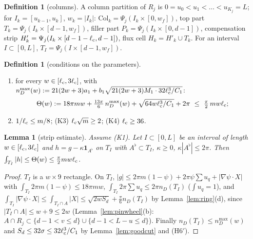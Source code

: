 \documentclass[11pt]{article}
\newtheorem{lemma}[theorem]{Lemma}
\theoremstyle{definition}
\newtheorem{definition}[theorem]{Definition}
\theoremstyle{remark}
\newcommand{\lc}{\ell_{\rm c}}
\begin{document}
\begin{definition}[columns]\label{def:columns}
A column partition of $R_j$ is $0=u_0<u_1<\dots<u_{K_j}=L$; for $I_k=[u_{k-1},u_k]$, $w_k=|I_k|$:
$\mathrm{Col}_k=\Psi_j(I_k\times[0,w_f])$, top part $T_k=\Psi_j(I_k\times[d-1,w_f])$, filler part $P_k=\Psi_j(I_k\times[0,d-1])$,
compensation strip $H'_k=\Psi_j(I_k\times[d-1-\lc,d-1])$, flux cell $H_k=H'_k\cup T_k$. For an interval $I\subset[0,L]$, $T_I=\Psi_j(I\times[d-1,w_f])$.
\end{definition}

\begin{definition}[conditions on the parameters]\label{def:K}
\begin{enumerate}[label=(K\arabic*)]
\item for every $w\in[\lc,3\lc]$, with $n_D^{\max}(w):=21(2w+3)a_1+b_1\sqrt{21(2w+3)M_1\cdot32\lc^3/C_1}$:
\[
\Theta(w):=18\pi mw+\tfrac{13\pi}6\,n_D^{\max}(w)+\sqrt{64w\lc^3/C_1}+2\pi\ \le\ \tfrac\pi2\,mw\lc ;
\]
\item $1/\lc\le m/8$; \quad (K3) $\lc\sqrt m\ge2$; \quad (K4) $\lc\ge36$.
\end{enumerate}
\end{definition}

\begin{lemma}[strip estimate]\label{lem:strip}
Assume (K1). Let $I\subset[0,L]$ be an interval of length $w\in[\lc,3\lc]$ and $h=g-\kappa\mathbf 1_{A^\flat}$ on $T_I$ with $A^\flat\subset T_I$, $\kappa\ge0$,
$\kappa|A^\flat|\le2\pi$. Then $\int_{T_I}|h|\le\Theta(w)\le\frac\pi2mw\lc$.
\end{lemma}
\begin{proof}
$T_I$ is a $w\times9$ rectangle. On $T_I$, $|g|\le2\pi m(1-\psi)+2\pi\psi\sum u_q+|\nabla\psi\cdot X|$ with $\int_{T_I}2\pi m(1-\psi)\le18\pi mw$,
$\int_{T_I}2\pi\sum u_q\le2\pi n_D(T_I)$ ($\int u_q=1$), and $\int_{T_I}|\nabla\psi\cdot X|\le\int_{T_I\cap A}|X|\le\sqrt{2wS_d}+\frac\pi6n_D(T_I)$
by Lemma~\ref{lem:ring}(d), since $|T_I\cap A|\le w+9\le2w$ (Lemma~\ref{lem:pinwheel}(b): $A\cap R_j\subset\{d-1<v\le d\}\cup\{d-1<L-u\le d\}$). Finally
$n_D(T_I)\le n_D^{\max}(w)$ and $S_d\le32\sigma\le32\lc^3/C_1$ by Lemma~\ref{lem:goodcut} and (H6$'$).
\end{proof}
\end{document}
